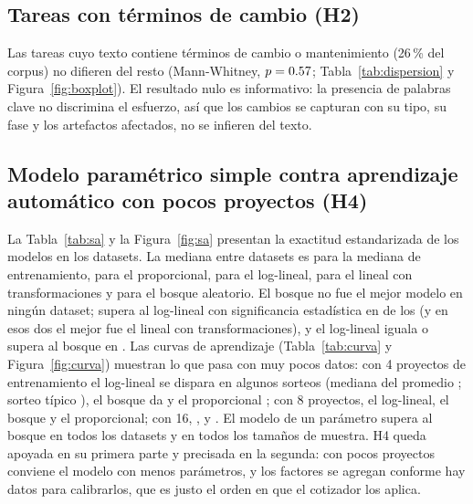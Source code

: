 \documentclass[10pt,twocolumn]{article}
\begin{document}


\subsection{Tareas con términos de cambio (H2)}
Las tareas cuyo texto contiene términos de cambio o mantenimiento (26\,\% del corpus) no difieren del resto (Mann-Whitney, $p=0.57$; Tabla~\ref{tab:dispersion} y Figura~\ref{fig:boxplot}). El resultado nulo es informativo: la presencia de palabras clave no discrimina el esfuerzo, así que los cambios se capturan con su tipo, su fase y los artefactos afectados, no se infieren del texto.



\subsection{Modelo paramétrico simple contra aprendizaje automático con pocos proyectos (H4)}
La Tabla~\ref{tab:sa} y la Figura~\ref{fig:sa} presentan la exactitud estandarizada de los modelos en los \nuevoNconjuntos{} datasets. La mediana entre datasets es \nuevoSAmedMediana{} para la mediana de entrenamiento, \nuevoSAmedPropor{} para el proporcional, \nuevoSAmedLoglin{} para el log-lineal, \nuevoSAmedATLM{} para el lineal con transformaciones y \nuevoSAmedRF{} para el bosque aleatorio. El bosque no fue el mejor modelo en ningún dataset; supera al log-lineal con significancia estadística en \nuevoRFganaP{} de los \nuevoNconjuntos{} (y en esos dos el mejor fue el lineal con transformaciones), y el log-lineal iguala o supera al bosque en \nuevoLoglinGanaOEmpata{}. Las curvas de aprendizaje (Tabla~\ref{tab:curva} y Figura~\ref{fig:curva}) muestran lo que pasa con muy pocos datos: con 4 proyectos de entrenamiento el log-lineal se dispara en algunos sorteos (mediana del promedio \nuevoCurvaCuatroLoglin{}; sorteo típico \nuevoCurvaTipCuatroLoglin{}), el bosque da \nuevoCurvaCuatroRF{} y el proporcional \nuevoCurvaCuatroPropor{}; con 8 proyectos, \nuevoCurvaOchoLoglin{} el log-lineal, \nuevoCurvaOchoRF{} el bosque y \nuevoCurvaOchoPropor{} el proporcional; con 16, \nuevoCurvaDieciseisLoglin{}, \nuevoCurvaDieciseisRF{} y \nuevoCurvaDieciseisPropor{}. El modelo de un parámetro supera al bosque en todos los datasets y en todos los tamaños de muestra. H4 queda apoyada en su primera parte y precisada en la segunda: con pocos proyectos conviene el modelo con menos parámetros, y los factores se agregan conforme hay datos para calibrarlos, que es justo el orden en que el cotizador los aplica.
\end{document}
